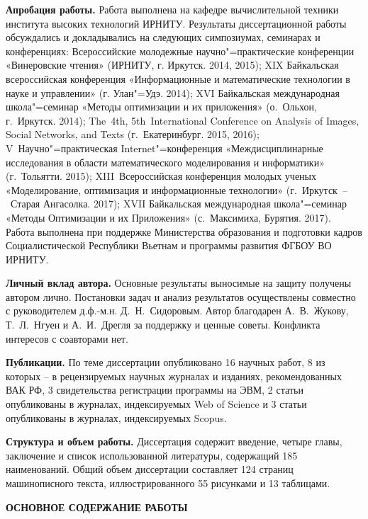 \textbf{Апробация работы.} Работа выполнена на кафедре вычислительной техники института высоких технологий ИРНИТУ. Результаты диссертационной работы обсуждались и докладывались на следующих симпозиумах, семинарах и конференциях: Всероссийские молодежные научно"=практические конференции «Винеровские чтения» (ИРНИТУ, г. Иркутск. 2014, 2015); XIX Байкальская всероссийская конференция «Информационные и математические технологии в науке и управлении» (г. Улан"=Удэ. 2014); XVI Байкальская международная школа"=семинар «Методы оптимизации и их приложения» (о.~Ольхон, г.~Иркутск. 2014); The~4th, 5th~International Conference on Analysis of Images, Social Networks, and Texts (г.~Екатеринбург. 2015, 2016); V~Научно"=практическая Internet"=конференция «Междисциплинарные исследования в области математического моделирования и информатики» (г.~Тольятти. 2015); XIII~Всероссийская конференция молодых ученых «Моделирование, оптимизация и информационные технологии» (г.~Иркутск~--~Старая Ангасолка. 2017); XVII Байкальская международная школа"=семинар «Методы Оптимизации и их Приложения» (с.~Максимиха, Бурятия. 2017). Работа выполнена при поддержке Министерства образования и подготовки кадров Социалистической Республики Вьетнам и программы развития ФГБОУ ВО ИРНИТУ.

\textbf{Личный вклад автора.} Основные результаты выносимые на защиту получены автором лично. Постановки задач и анализ результатов осуществлены совместно с руководителем д.ф.-м.н. Д.~Н.~Сидоровым. Автор благодарен А.~В.~Жукову, Т.~Л.~Нгуен и А.~И.~Дрегля за поддержку и ценные советы. Конфликта интересов с соавторами нет.

\textbf{Публикации.} По теме диссертации опубликовано 16 научных работ, 8 из которых -- в рецензируемых научных журналах и изданиях, рекомендованных ВАК РФ, 3 свидетельства регистрации программы на ЭВМ, 2 статьи опубликованы в журналах, индексируемых Web of Science и 3 статьи опубликованы в журналах, индексируемых Scopus.

\textbf{Структура и объем работы.} Диссертация содержит введение, четыре главы, заключение и список использованной литературы, содержащий 185 наименований. Общий объем диссертации составляет 124 страниц машинописного текста, иллюстрированного 55 рисунками и 13 таблицами.
\begin{center}
\textbf{ОСНОВНОЕ СОДЕРЖАНИЕ РАБОТЫ}
\end{center}

